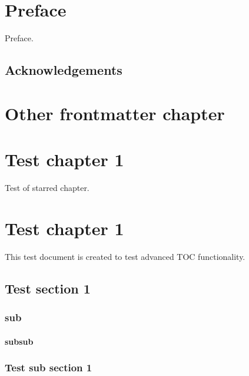 \documentclass{book}
\begin{document}
%

\frontmatter

\chapter{Preface}
Preface.

\section{Acknowledgements}

\chapter[Other]{Other frontmatter chapter}

\tableofcontents

\mainmatter

\chapter*{Test chapter 1}
Test of starred chapter.

\chapter{Test chapter 1}
This test document is created to test advanced TOC functionality.

\section{Test section 1}

\subsection{sub}

\subsubsection{subsub}


\subsection{Test sub section 1}
\end{document}
